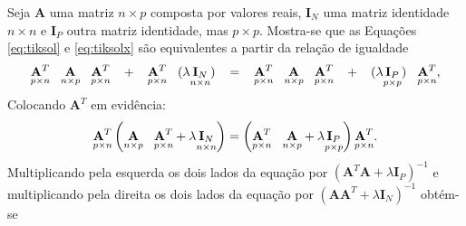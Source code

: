 Seja $\mathbf{A}$ uma matriz $n \times p$ composta por valores reais, $\mathbf{I}_N$ uma matriz identidade $n \times n$ e $\mathbf{I}_P$ outra matriz identidade, mas $p \times p$. Mostra-se que as Equações \eqref{eq:tiksol} e \eqref{eq:tiksolx} são equivalentes a partir da relação de igualdade
\begin{equation}
\underset{p \times n}{\mathbf{A}^T}  \hspace{3mm} \underset{n \times p}{\mathbf{A}} \hspace{3mm} \underset{p \times n}{\mathbf{A}^T} \hspace{3mm} + \hspace{3mm} \underset{p \times n}{\mathbf{A}^T}\hspace{3mm}  (\lambda \underset{n \times n}{\mathbf{I}_N}) \hspace{3mm} = \hspace{3mm} \underset{p \times n}{\mathbf{A}^T}  \hspace{3mm} \underset{n \times p}{\mathbf{A}} \hspace{3mm} \underset{p \times n}{\mathbf{A}^T} \hspace{3mm} + \hspace{3mm} (\lambda \underset{p \times p}{\mathbf{I}_P})  \hspace{3mm} \underset{p \times n}{\mathbf{A}^T},
\label{eq:apendiceD}
\end{equation}
Colocando $\mathbf{A}^T$ em evidência:
\begin{equation}
\underset{p \times n}{\mathbf{A}^T}  \left(\underset{n \times p}{\mathbf{A}} \hspace{3mm} \underset{p \times n}{\mathbf{A}^T} +  \lambda \underset{n \times n}{\mathbf{I}_N}\right) = \left(\underset{p \times n}{\mathbf{A}^T}  \hspace{3mm} \underset{n \times p}{\mathbf{A}} + \lambda \underset{p \times p}{\mathbf{I}_P}\right)  \underset{p \times n}{\mathbf{A}^T}.
\end{equation}
Multiplicando pela esquerda os dois lados da equação por $\left(\mathbf{A}^T   \mathbf{A} + \lambda \mathbf{I}_P\right)^{-1}$ e multiplicando pela direita os dois lados da equação por $\left(\mathbf{A}  \mathbf{A}^T +  \lambda \mathbf{I}_N\right)^{-1}$ obtém-se
